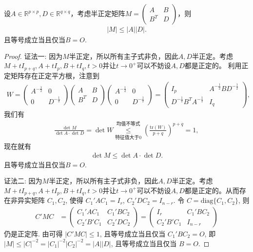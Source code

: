 \documentclass[../../main.tex]{subfiles}%
\begin{document}
\begin{proposition}[Fischer不等式]\label{proposition:Fischer不等式}
设$A \in \mathbb{R}^{p \times p}, D \in \mathbb{R}^{q \times q}$，考虑半正定矩阵$M = \begin{pmatrix} A & B \\ B^T & D \end{pmatrix}$，则
\begin{align*}
|M| \leqslant |A||D|.
\end{align*}
且等号成立当且仅当$B=O.$
\end{proposition}
\begin{proof}

{\color{blue}证法一:}
因为$M$半正定，所以所有主子式非负，因此$A,D$半正定。考虑$M + tI_{p+q}, A + tI_p, B + tI_q, t > 0$并让$t \to 0^+$可以不妨设$A,D$都是正定的。
利用正定矩阵存在正定平方根，注意到
\begin{align*}
W = \begin{pmatrix} A^{-\frac{1}{2}} & 0 \\ 0 & D^{-\frac{1}{2}} \end{pmatrix} \begin{pmatrix} A & B \\ B^T & D \end{pmatrix} \begin{pmatrix} A^{-\frac{1}{2}} & 0 \\ 0 & D^{-\frac{1}{2}} \end{pmatrix} = \begin{pmatrix} I_p & A^{-\frac{1}{2}}BD^{-\frac{1}{2}} \\ D^{-\frac{1}{2}}B^T A^{-\frac{1}{2}} & I_q \end{pmatrix},
\end{align*}
我们有
\begin{align*}
\frac{\det M}{\det A \cdot \det D} = \det W \overset{\text{均值不等式}}{\underset{\text{特征值大于0}}{\leqslant}} \left( \frac{\text{tr}(W)}{p+q} \right)^{p+q} = 1,
\end{align*}
现在就有
\begin{align*}
\det M \leqslant \det A \cdot \det D.
\end{align*}
且等号成立当且仅当$B=O$.

{\color{blue}证法二:}
因为$M$半正定，所以所有主子式非负，因此$A,D$半正定。考虑$M + tI_{p+q}, A + tI_p, B + tI_q, t > 0$并让$t \to 0^+$可以不妨设$A,D$都是正定的。从而存在非异实矩阵 \(C_1,C_2\), 使得 \(C_1'AC_1=I_r\), \(C_2'DC_2=I_{n - r}\). 令 \(C=\text{diag}\{C_1,C_2\}\), 则
\begin{align*}
C'MC&=\begin{pmatrix}C_1'AC_1&C_1'BC_2\\C_2'B'C_1&C_2'DC_2\end{pmatrix}=\begin{pmatrix}I_r&C_1'BC_2\\C_2'B'C_1&I_{n - r}\end{pmatrix}
\end{align*}
仍是正定阵. 由可得 \(|C'MC|\leqslant 1\), 且等号成立当且仅当 \(C_1'BC_2=O\), 即 \(|M|\leqslant |C|^{-2}=|C_1|^{-2}|C_2|^{-2}=|A||D|\), 且等号成立当且仅当 \(B=O\). 


\end{proof}
\end{document}
